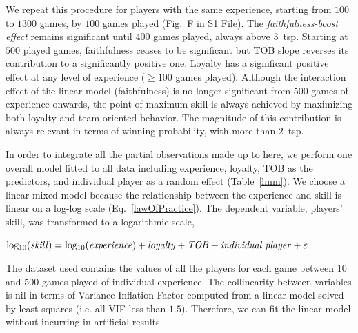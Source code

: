 \documentclass[a4paper,10pt]{book}
\theoremstyle{definition}
\begin{document}
We repeat this procedure for players with the same experience, starting from $100$ to $1300$ games, by $100$ games played (Fig.~F in S1 File).
The \emph{faithfulness-boost effect} remains significant until $400$ games played, always above $3$~tsp.
Starting at $500$ played games, faithfulness ceases to be significant but TOB slope reverses its contribution to a significantly positive one.
Loyalty has a significant positive effect at any level of experience ($\geq 100$ games played).
Although the interaction effect of the linear model (faithfulness) is no longer significant from $500$ games of experience onwards, the point of maximum skill is always achieved by maximizing both loyalty and team-oriented behavior.
The magnitude of this contribution is always relevant in terms of winning probability, with more than $2$~tsp.

In order to integrate all the partial observations made up to here, we perform one overall model fitted to all data including experience, loyalty, TOB as the predictors, and individual player as a random effect (Table~\ref{lmm}).
We choose a linear mixed model because the relationship between the experience and skill is linear on a log-log scale (Eq.~\ref{lawOfPractice}).
The dependent variable, players' skill, was transformed to a logarithmic scale,
  
\begin{center}    
$\text{log$_{10}$(\emph{skill})} = \text{log$_{10}$(\emph{experience})} + \text{\emph{loyalty}} + \text{\emph{TOB}} + \text{\emph{individual player}} + \varepsilon$
\end{center}

The dataset used contains the values of all the players for each game between $10$ and $500$ games played of individual experience.
The collinearity between variables is nil in terms of Variance Inflation Factor computed from a linear model solved by least squares (i.e. all VIF less than $1.5$).
Therefore, we can fit the linear model without incurring in artificial results.
\end{document}
